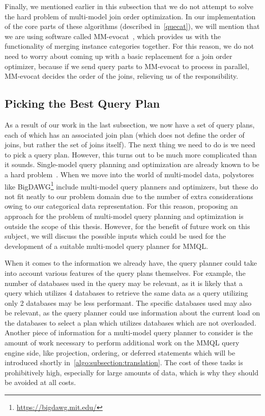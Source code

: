 Finally, we mentioned earlier in this subsection that we do not attempt to solve the hard problem of multi-model join order optimization.
In our implementation of the core parts of these algorithms (described in~\cref{quecat}), we will mention that we are using software called MM-evocat~\cite{evocat}, which provides us with the functionality of merging instance categories together.
For this reason, we do not need to worry about coming up with a basic replacement for a join order optimizer, because if we send query parts to MM-evocat to process in parallel, MM-evocat decides the order of the joins, relieving us of the responsibility.

\subsection{Picking the Best Query Plan}
\label{algo:subsection:bestplan}

As a result of our work in the last subsection, we now have a set of query plans, each of which has an associated join plan (which does not define the order of joins, but rather the set of joins itself).
The next thing we need to do is we need to pick a query plan.
However, this turns out to be much more complicated than it sounds.
Single-model query planning and optimization are already known to be a hard problem~\cite{query_optimization}.
When we move into the world of multi-model data, polystores like BigDAWG\footnote{\url{https://bigdawg.mit.edu/}} include multi-model query planners and optimizers, but these do not fit neatly to our problem domain due to the number of extra considerations owing to our categorical data representation.
For this reason, proposing an approach for the problem of multi-model query planning and optimization is outside the scope of this thesis.
However, for the benefit of future work on this subject, we will discuss the possible inputs which could be used for the development of a suitable multi-model query planner for MMQL.

When it comes to the information we already have, the query planner could take into account various features of the query plans themselves.
For example, the number of databases used in the query may be relevant, as it is likely that a query which utilizes 4 databases to retrieve the same data as a query utilizing only 2 databases may be less performant.
The specific databases used may also be relevant, as the query planner could use information about the current load on the databases to select a plan which utilizes databases which are not overloaded.
Another piece of information for a multi-model query planner to consider is the amount of work necessary to perform additional work on the MMQL query engine side, like projection, ordering, or deferred statements which will be introduced shortly in~\cref{algo:subsection:translation}.
The cost of these tasks is prohibitively high, especially for large amounts of data, which is why they should be avoided at all costs.

